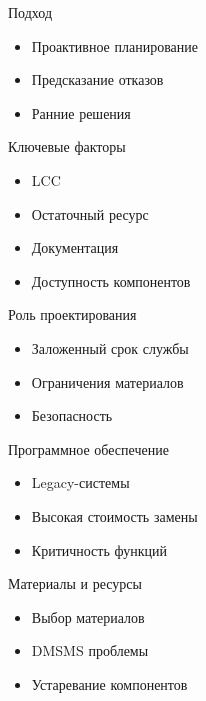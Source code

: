 \documentclass{beamer}
\begin{document}
\begin{frame}{Подход}
\begin{itemize}
    \item Проактивное планирование
    \item Предсказание отказов
    \item Ранние решения
\end{itemize}

\end{frame}


\begin{frame}{Ключевые факторы}
\begin{itemize}
    \item LCC
    \item Остаточный ресурс
    \item Документация
    \item Доступность компонентов
\end{itemize}

\end{frame}


\begin{frame}{Роль проектирования}
\begin{itemize}
    \item Заложенный срок службы
    \item Ограничения материалов
    \item Безопасность
\end{itemize}

\end{frame}


\begin{frame}{Программное обеспечение}
\begin{itemize}
    \item Legacy-системы
    \item Высокая стоимость замены
    \item Критичность функций
\end{itemize}

\end{frame}


\begin{frame}{Материалы и ресурсы}
\begin{itemize}
    \item Выбор материалов
    \item DMSMS проблемы
    \item Устаревание компонентов
\end{itemize}

\end{frame}
\end{document}
